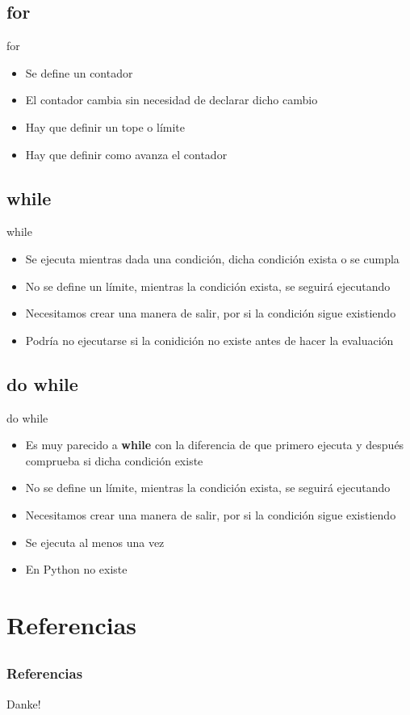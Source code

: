 \documentclass{beamer}
\begin{document}
	\subsection{for}
	\begin{frame}{for}
		\begin{itemize}
			\item Se define un contador
			\item El contador cambia sin necesidad de declarar dicho cambio
			\item Hay que definir un tope o l\'imite
			\item Hay que definir como avanza el contador
		\end{itemize}
	\end{frame}
	
	\subsection{while}
	\begin{frame}{while}
		\begin{itemize}
			\item Se ejecuta mientras dada una condici\'on, dicha condici\'on exista o se cumpla
			\item No se define un l\'imite, mientras la condici\'on exista, se seguir\'a ejecutando 
			\item Necesitamos crear una manera de salir, por si la condici\'on sigue existiendo
			\item Podr\'ia no ejecutarse si la conidici\'on no existe antes de hacer la evaluaci\'on
		\end{itemize}
	\end{frame}
	
	\subsection{do while}
	\begin{frame}{do while}
		\begin{itemize}
			\item Es muy parecido a \textbf{while} con la diferencia de que primero ejecuta y despu\'es comprueba si dicha condici\'on existe
			\item No se define un l\'imite, mientras la condici\'on exista, se seguir\'a ejecutando
			\item Necesitamos crear una manera de salir, por si la condici\'on sigue existiendo
			\item Se ejecuta al menos una vez
			\item En Python no existe
		\end{itemize}
	\end{frame}
	
	\section{Referencias}
	\subsection{}
	\begin{frame}[allowframebreaks]
		\frametitle{Referencias}
		
		
	\end{frame}
	
	\begin{frame}
		\begin{center}
			{\Huge\calligra Danke!}
		\end{center}
	\end{frame}
	
\end{document}
